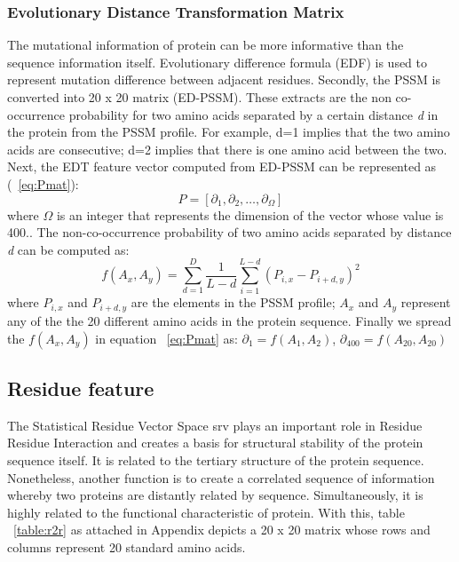   \subsubsection{Evolutionary Distance Transformation Matrix}
  The mutational information of protein can be more informative than the sequence information itself\citep{Zhang2014}. Evolutionary difference formula (EDF) is used to represent mutation difference between adjacent residues. Secondly, the PSSM is converted into 20 x 20 matrix (ED-PSSM). These extracts are the non co-occurrence probability for two amino acids separated by a certain distance \textit{d} in the protein from the PSSM profile. For example, d=1 implies that the two amino acids are consecutive; d=2 implies that there is one amino acid between the two. Next, the EDT feature vector computed from ED-PSSM can be represented as (~\ref{eq:Pmat}): 
  \begin{equation}
    \label{eq:Pmat}
    P = [ \partial_1 ,\partial_2, \dots, \partial_\Omega]
  \end{equation}
  where $\Omega$ is an integer that represents the dimension of the vector whose value is 400.. The non-co-occurrence probability of two amino acids separated by distance \textit{d} can be computed as:
  \begin{equation}
    f(A_x,A_y) = \sum_{d=1}^{D} \frac{1}{L-d} \sum_{i=1}^{L-d} (P_{i,x} - P_{i+d,y})^2
    \label{eq:edt}
  \end{equation}
  where $P_{i,x}$ and $P_{i+d,y}$ are the elements in the PSSM profile; $A_x$ and $A_y$ represent any of the the 20 different amino acids in the protein sequence. Finally we spread the $f(A_x,A_y)$ in equation ~\ref{eq:Pmat} as:
  $ \partial_1 = f(A_1,A_2) $, 
  $ \partial_{400} = f(A_{20}, A_{20}) $
  
  
  \subsection{Residue feature} 
  The Statistical Residue Vector Space \acrshort{srv} \citep{Wong2018} plays an important role in Residue Residue Interaction and creates a basis for structural stability of the protein sequence itself. It is related to the tertiary structure of the protein sequence. Nonetheless, another function is to create a correlated sequence of information whereby two proteins are distantly related by sequence. Simultaneously, it is highly related to the functional characteristic of protein.  With this, table ~\ref{table:r2r} as attached in Appendix depicts a 20 x 20 matrix whose rows and columns represent 20 standard amino acids.
  
